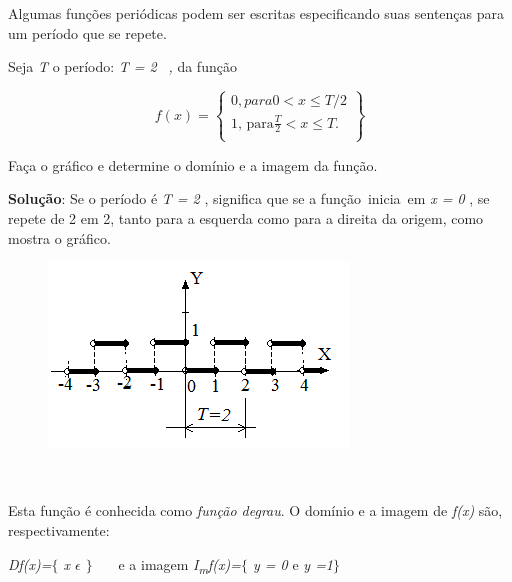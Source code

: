 \begin{texemplo}
Algumas funções periódicas podem ser escritas especificando suas sentenças para um período que se repete. 

\quad Seja \textit{T} o período: \textit{T = 2}~ \textit{,} da função 

 \[ f \left( x \right) = \left\{ \begin{matrix}
0, para 0 < x \leq T/2\\
\text{1, para}\frac{T}{2}< x \leq T.\\
\end{matrix}\right\}
\] 

\quad Faça o gráfico e determine o domínio e a imagem da função.

\textbf{Solução}: Se o período é \textit{T = 2} , significa que se a função~inicia~em   \textit{x = 0} , se repete de 2 em 2, tanto para a esquerda como para a direita da origem, como mostra o gráfico.

\begin{figure}[H]
	\begin{Center}
		\includegraphics[width=3.15in,height=1.95in]{capitulos/outras_funcoes/media/image25.png}
	\end{Center}
\end{figure}

~~

Esta função é conhecida como \textit{função degrau}. O domínio e a imagem de \textit{f(x)} são, respectivamente: 

\textit{Df(x)=$ \{ $ x $ \epsilon $  \textbf{ }$ \} $ }~~~e a imagem  \textit{I\textsubscript{m}f(x)=$ \{ $ y = 0 }e\textit{ y =1$ \} $ } \qedsymbol{}

\end{texemplo}
